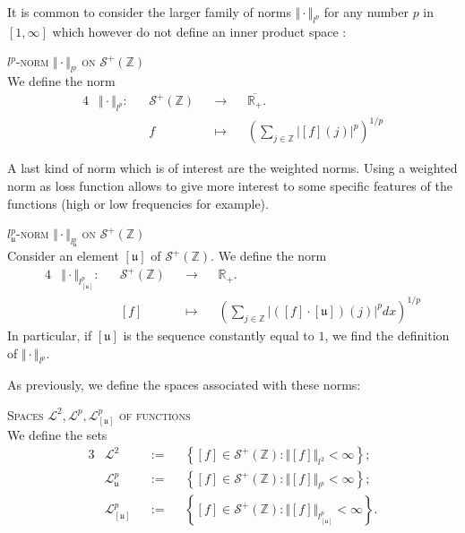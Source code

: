 It is common to consider the larger family of norms $\Vert \cdot \Vert_{l^{p}}$ for any number $p$ in $[1, \infty]$ which however do not define an inner product space :
\begin{de}{\textsc{$l^{p}$-norm $\Vert \cdot \Vert_{l^{p}}$ on $\mathcal{S}^{+}(\mathds{Z})$}\\}\label{de1.4.14}
We define the norm
\begin{alignat*}{4}
& \Vert \cdot \Vert_{l^{p}} : && \mathcal{S}^{+}(\mathds{Z}) && \rightarrow && \overline{\mathds{R}_{+}}.\\
& && f && \mapsto && \left(\sum\limits_{j \in \mathds{Z}} \vert [f](j) \vert^{p}\right)^{1/p}
\end{alignat*}
\end{de}

A last kind of norm which is of interest are the weighted norms.
Using a weighted norm as loss function allows to give more interest to some specific features of the functions (high or low frequencies for example).
\begin{de}{\textsc{$l^{p}_{\mathfrak{u}}$-norm $\Vert \cdot \Vert_{l^{p}_{\mathfrak{u}}}$ on $\mathcal{S}^{+}(\mathds{Z})$}\\}\label{de1.4.15}
Consider an element $[\mathfrak{u}]$ of $\mathcal{S}^{+}(\mathds{Z})$.
We define the norm
\begin{alignat*}{4}
& \Vert \cdot \Vert_{l^{p}_{[\mathfrak{u}]}} : && \mathcal{S}^{+}(\mathds{Z}) && \rightarrow && \mathds{R}_{+}.\\
& && [f] && \mapsto && \left(\sum\limits_{j \in \mathds{Z}} \vert ([f]\cdot[\mathfrak{u}])(j)\vert^{p} dx\right)^{1/p}
\end{alignat*}
In particular, if $[\mathfrak{u}]$ is the sequence constantly equal to $1$, we find the definition of $\Vert \cdot \Vert_{l^{p}}$.
\end{de}

As previously, we define the spaces associated with these norms:
\begin{de}{\textsc{Spaces $\mathcal{L}^{2}, \mathcal{L}^{p}, \mathcal{L}_{[\mathfrak{u}]}^{p}$ of functions}\\}\label{de1.4.16}
We define the sets
\begin{alignat*}{3}
&\mathcal{L}^{2} &&:=&& \left\{[f] \in \mathcal{S}^{+}(\mathds{Z}) : \Vert [f] \Vert_{l^{2}} < \infty \right\};\\
&\mathcal{L}_{\mathfrak{u}}^{p} &&:=&& \left\{[f] \in \mathcal{S}^{+}(\mathds{Z}) : \Vert [f] \Vert_{l^{p}} < \infty \right\};\\
&\mathcal{L}_{[\mathfrak{u}]}^{p} &&:=&& \left\{[f] \in \mathcal{S}^{+}(\mathds{Z}) : \Vert [f] \Vert_{l_{[\mathfrak{u}]}^{p}} < \infty \right\}.
\end{alignat*}
\end{de}

